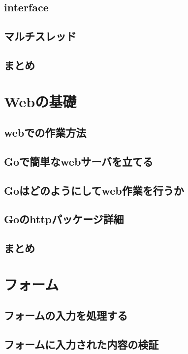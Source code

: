 \subsection{interface}

\subsection{マルチスレッド}

\subsection{まとめ}



\section{Webの基礎}

\subsection{webでの作業方法}

\subsection{Goで簡単なwebサーバを立てる}


\subsection{Goはどのようにしてweb作業を行うか}

\subsection{Goのhttpパッケージ詳細}

\subsection{まとめ}


\section{フォーム}

\subsection{フォームの入力を処理する}

\subsection{フォームに入力された内容の検証}

